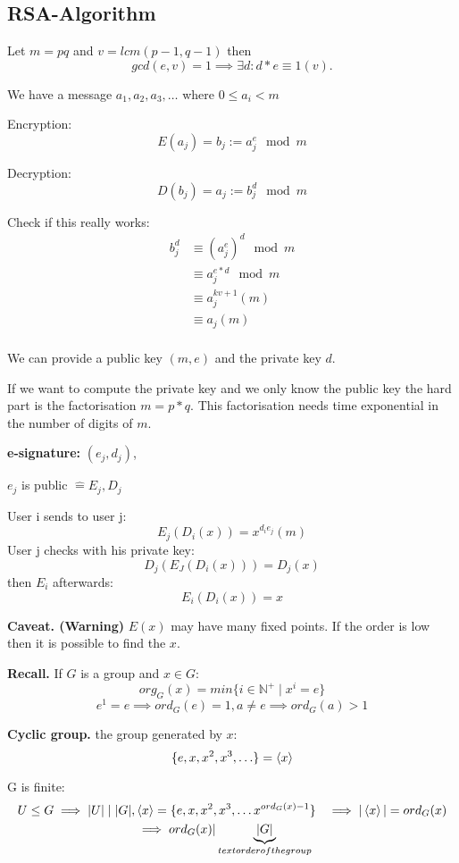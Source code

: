 \subsection{RSA-Algorithm}
Let $m = pq$ and $v = lcm(p-1, q-1)$ then 
\[
  gcd(e,v) = 1 \implies \exists d : d *e \equiv 1 (v).
\]

We have a message $a_1, a_2, a_3, \ldots$ where $0 \leq a_i < m$

Encryption: 
\[
  E(a_j) = b_j := a_j^e \mod m
\]

Decryption: 
\[
  D(b_j) = a_j := b_j^d \mod m
\]

Check if this really works:
\begin{align*}
  b_j^d &\equiv (a_j^e)^d \mod m \\
    & \equiv a_j^{e*d} \mod m \\
    & \equiv a_j^{kv+1} (m) \\
    & \equiv a_j (m) \\
\end{align*}

We can provide a public key $(m,e)$ and the private key $d$.

If we want to compute the private key and we only know the public key the hard part is the factorisation $m = p*q$. This factorisation needs time exponential in the number of digits of $m$.

\textbf{e-signature: } 
$(e_j,d_j)$,

$e_j$ is public $\hat{=} E_j, D_j$

User i sends to user j:
\[
  E_j(D_i(x)) = x^{d_i e_j} (m)
\]
User j checks with his private key:
\[
  D_j (E_J(D_i(x))) = D_j(x)
\]
then $E_i$ afterwards:
\[
  E_i(D_i(x)) = x
\]

\textbf{Caveat. (Warning)}
$E(x)$ may have many fixed points. 
If the order is low then it is possible to find the $x$. 

\textbf{Recall.}
If $G$ is a group and $x\in G$:
\[
  org_G(x) = min\{ i\in \mathbb{N}^{+} \mid x^i = e \}
\]
\[
  e^1 = e \implies ord_G(e) = 1, a \neq e \implies ord_G(a) > 1
\]

\textbf{Cyclic group.}
the group generated by $x$:
\[
  \{ e, x, x^2, x^3, \ldots \} = \left\langle x \right\rangle
\]

G is finite:
\begin{align*}
  U \leq  G \implies |U| \mid |G|, 
  & \left\langle x \right\rangle = \{ e, x, x^2, x^3, \ldots x^{ord_G(x) -1}\}
    &\implies |\left\langle x \right\rangle| = ord_G(x) \\
    &\implies ord_G(x) | \underbrace{|G|}_{text{order of the group}} \\
\end{align*}

